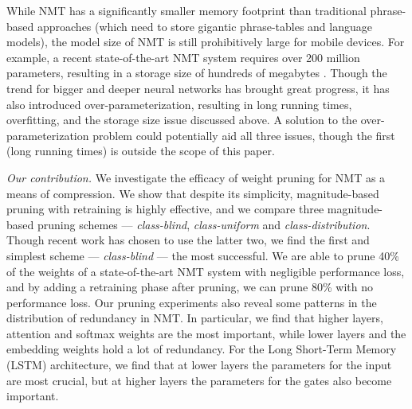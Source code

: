


While NMT has a significantly smaller memory footprint than traditional phrase-based approaches (which need to store gigantic phrase-tables and
language models), the model size of NMT is still prohibitively large for mobile devices.
For example, a recent state-of-the-art NMT system requires over 200 million
parameters, resulting in a storage size of hundreds of megabytes
\cite{luong15attn}. 
Though the trend for bigger and deeper neural networks has brought great progress, it has also introduced over-parameterization, resulting in long running times, overfitting, and the storage size issue discussed above. 
A solution to the over-parameterization problem could potentially aid all three issues, though the first (long running times) is outside the scope of this paper.

{\it Our contribution.}
We investigate the efficacy of weight pruning for NMT as a means of compression.
We show that despite its simplicity, magnitude-based pruning with retraining is highly effective, and we compare three magnitude-based pruning schemes --- \textit{class-blind}, \textit{class-uniform} and \textit{class-distribution}.
Though recent work has chosen to use the latter two, we find the first and simplest scheme --- \textit{class-blind} --- the most successful.
We are able to prune 40\% of the weights of a state-of-the-art NMT system with negligible performance loss, and by adding a retraining phase after pruning, we can prune 80\% with no performance loss.
Our pruning experiments also reveal some patterns in the distribution of
redundancy in NMT. In particular, we find that higher layers, attention and softmax weights are the most important, while lower layers and the embedding weights hold a lot of redundancy. 
For the Long Short-Term Memory (LSTM) architecture, we find that at lower layers the parameters for the input are most crucial, but at higher layers the parameters for the gates also become important.
